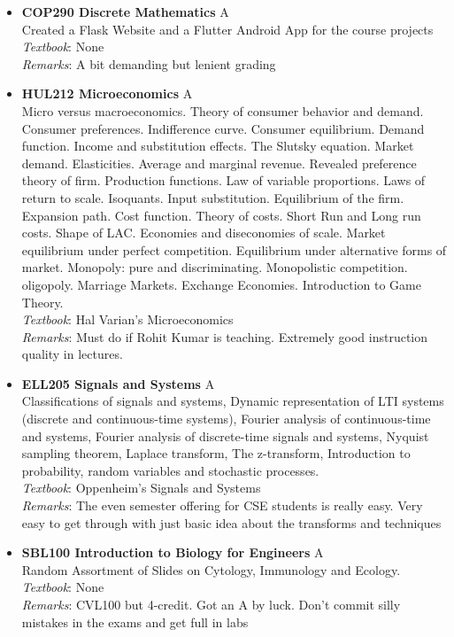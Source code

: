 \documentclass[a4paper]{article}
\begin{document}
\begin{itemize}
    \item \textbf{COP290 Discrete Mathematics} {\color{red}A}
    \\
    Created a Flask Website and a Flutter Android App for the course projects
    \\
    \textit{Textbook}: None
    \\
    \textit{Remarks}: A bit demanding but lenient grading
    \item \textbf{HUL212 Microeconomics} {\color{red}A}
    \\
    Micro versus macroeconomics. Theory of consumer behavior and demand. Consumer preferences. Indifference curve. Consumer equilibrium. Demand function. Income and substitution effects. The Slutsky equation. Market demand. Elasticities. Average and marginal revenue. Revealed preference theory of firm. Production functions. Law of variable proportions. Laws of return to scale. Isoquants. Input substitution. Equilibrium of the firm. Expansion path. Cost function. Theory of costs. Short Run and Long run costs. Shape of LAC. Economies and diseconomies of scale. Market equilibrium under perfect competition. Equilibrium under alternative forms of market. Monopoly: pure and discriminating. Monopolistic competition. oligopoly. Marriage Markets. Exchange Economies. Introduction to Game Theory.
     \\
    \textit{Textbook}: Hal Varian's Microeconomics
    \\
    \textit{Remarks}: Must do if Rohit Kumar is teaching. Extremely good instruction quality in lectures.
\item \textbf{ELL205 Signals and Systems} {\color{red}A}
    \\
    Classifications of signals and systems, Dynamic representation of LTI systems (discrete and continuous-time systems), Fourier analysis of continuous-time and systems, Fourier analysis of discrete-time signals and systems, Nyquist sampling theorem, Laplace transform, The z-transform, Introduction to probability, random variables and stochastic processes.
     \\
    \textit{Textbook}: Oppenheim's Signals and Systems
    \\
    \textit{Remarks}: The even semester offering for CSE students is really easy. Very easy to get through with just basic idea about the transforms and techniques
    \item \textbf{SBL100 Introduction to Biology for Engineers} {\color{red}A}
    \\
    Random Assortment of Slides on Cytology, Immunology and Ecology. 
     \\
    \textit{Textbook}: None
    \\
    \textit{Remarks}: CVL100 but 4-credit. Got an A by luck. Don't commit silly mistakes in the exams and get full in labs
\end{itemize}
\newpage
\end{document}
